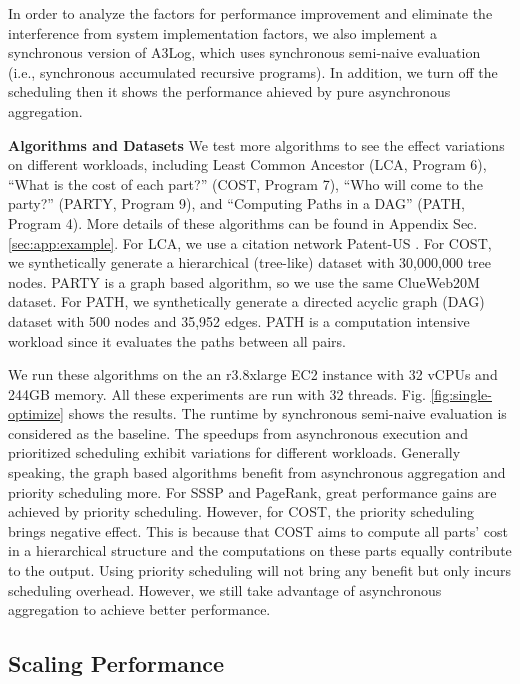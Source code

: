 In order to analyze the factors for performance improvement and eliminate the interference from system implementation factors, we also implement a synchronous version of A3Log, which uses synchronous semi-naive evaluation (i.e., synchronous accumulated recursive programs). In addition, we turn off the scheduling then it shows the performance ahieved by pure asynchronous aggregation.

\noindent\textbf{Algorithms and Datasets}
We test more algorithms to see the effect variations on different workloads, including Least Common Ancestor (LCA, Program 6), ``What is the cost of each part?'' (COST, Program 7), ``Who will come to the party?'' (PARTY, Program 9), and ``Computing Paths in a DAG'' (PATH, Program 4). More details of these algorithms can be found in Appendix Sec. \ref{sec:app:example}. For LCA, we use a citation network Patent-US \cite{konect}. For COST, we synthetically generate a hierarchical (tree-like) dataset with 30,000,000 tree nodes. PARTY is a graph based algorithm, so we use the same ClueWeb20M dataset. For PATH, we synthetically generate a directed acyclic graph (DAG) dataset with 500 nodes and 35,952 edges. PATH is a computation intensive workload since it evaluates the paths between all pairs.


We run these algorithms on the an r3.8xlarge EC2 instance with 32 vCPUs and 244GB memory. All these experiments are run with 32 threads. Fig. \ref{fig:single-optimize} shows the results. The runtime by synchronous semi-naive evaluation is considered as the baseline. The speedups from asynchronous execution and prioritized scheduling exhibit variations for different workloads. Generally speaking, the graph based algorithms benefit from asynchronous aggregation and priority scheduling more. For SSSP and PageRank, great performance gains are achieved by priority scheduling. However, for COST, the priority scheduling brings negative effect. This is because that COST aims to compute all parts' cost in a hierarchical structure and the computations on these parts equally contribute to the output. Using priority scheduling will not bring any benefit but only incurs scheduling overhead. However, we still take advantage of asynchronous aggregation to achieve better performance.


 \subsection{Scaling Performance}
 \label{sec:expr:scale}
 
